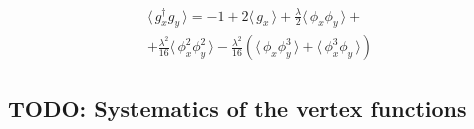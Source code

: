 \documentclass[12pt]{article}
\newcommand{\lr}[1]{ \left( #1 \right) }
\newcommand{\vev}[1]{ \langle \, #1 \, \rangle }
\begin{document}
\begin{eqnarray}
\label{gxgy_vev_lowest}
 \vev{g^{\dag}_x g_y} =
 -1 + 2 \vev{g_x} + \frac{\lambda}{2} \vev{\phi_x \phi_y}
 + \nonumber \\ +
   \frac{\lambda^2}{16} \vev{\phi_x^2 \phi_y^2}
 - \frac{\lambda^2}{16} \lr{\vev{\phi_x \phi_y^3} + \vev{\phi_x^3 \phi_y}}
\end{eqnarray}


\subsection{TODO: Systematics of the vertex functions}
\end{document}
